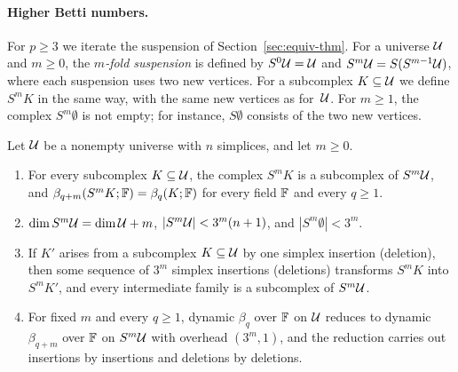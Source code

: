 \paragraph{Higher Betti numbers.}
For $p\ge3$ we iterate the suspension of Section~\ref{sec:equiv-thm}.
For a universe $\mathcal{U}$ and $m\ge0$, the \emph{$m$-fold suspension} is defined by $S^0\mathcal{U}=\mathcal{U}$ and $S^m\mathcal{U}=S(S^{m-1}\mathcal{U})$, where each suspension uses two new vertices.
For a subcomplex $K\subseteq\mathcal{U}$ we define $S^mK$ in the same way, with the same new vertices as for~$\mathcal{U}$.
For $m\ge1$, the complex $S^m\emptyset$ is not empty; for instance, $S\emptyset$ consists of the two new vertices.

\begin{lemma}\label{lem:lift}
Let $\mathcal{U}$ be a nonempty universe with $n$ simplices, and let $m\ge0$.
\begin{enumerate}[label=(\roman*)]
\item For every subcomplex $K\subseteq\mathcal{U}$, the complex $S^mK$ is a subcomplex of $S^m\mathcal{U}$, and $\beta_{q+m}(S^mK;\mathbb{F})=\beta_q(K;\mathbb{F})$ for every field $\mathbb{F}$ and every $q\ge1$.
\item $\dim S^m\mathcal{U}=\dim\mathcal{U}+m$, $|S^m\mathcal{U}|<3^m(n+1)$, and $|S^m\emptyset|<3^m$.
\item If $K'$ arises from a subcomplex $K\subseteq\mathcal{U}$ by one simplex insertion (deletion), then some sequence of $3^m$ simplex insertions (deletions) transforms $S^mK$ into $S^mK'$, and every intermediate family is a subcomplex of $S^m\mathcal{U}$.
\item For fixed $m$ and every $q\ge1$, dynamic $\beta_q$ over $\mathbb{F}$ on $\mathcal{U}$ reduces to dynamic $\beta_{q+m}$ over $\mathbb{F}$ on $S^m\mathcal{U}$ with overhead $(3^m,1)$, and the reduction carries out insertions by insertions and deletions by deletions.
\end{enumerate}
\end{lemma}

